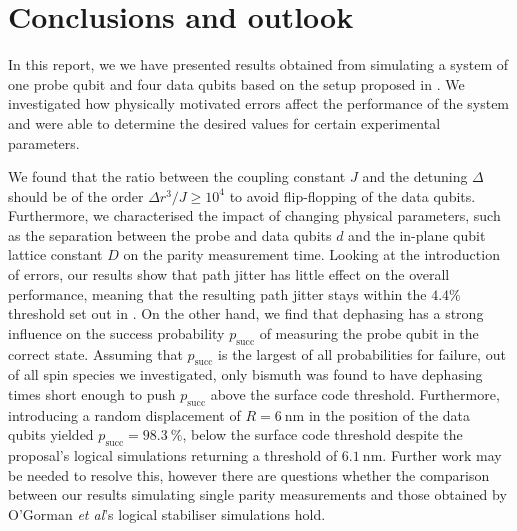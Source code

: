 
\section{Conclusions and outlook} \label{sec:conclusions}
In this report, we we have presented results obtained from simulating a system of one probe qubit and four data qubits based on the setup proposed in \cite{OGorman2016}. We investigated how physically motivated errors affect the performance of the system and were able to determine the desired values for certain experimental parameters. 

We found that the ratio between the coupling constant $J$ and the detuning $\Delta$ should be of the order $\Delta r^3/J \ge 10^4$ to avoid flip-flopping of the data qubits. Furthermore, we characterised the impact of changing physical parameters, such as the separation between the probe and data qubits $d$ and the in-plane qubit lattice constant $D$ on the parity measurement time.  
Looking at the introduction of errors, our results show that path jitter has little effect on the overall performance, meaning that the resulting path jitter stays within the $4.4\%$ threshold set out in \cite{OGorman2016}. On the other hand, we find that dephasing has a strong influence on the success probability $p_{\textrm{succ}}$ of measuring the probe qubit in the correct state. Assuming that $p_{\textrm{succ}}$ is the largest of all probabilities for failure, out of all spin species we investigated, only bismuth was found to have dephasing times short enough to push $p_{\textrm{succ}}$ above the surface code threshold. Furthermore, introducing a random displacement of $R = \SI{6}{\nano\metre}$ in the position of the data qubits yielded $p_{\textrm{succ}} = \SI{98.3}{\percent}$, below the surface code threshold \cite{Wang2011,Fowler2012} despite the proposal's logical simulations returning a threshold of $\SI{6.1}{\nano\metre}$. Further work may be needed to resolve this, however there are questions whether the comparison between our results simulating single parity measurements and those obtained by O'Gorman \textit{et al}'s logical stabiliser simulations hold.




